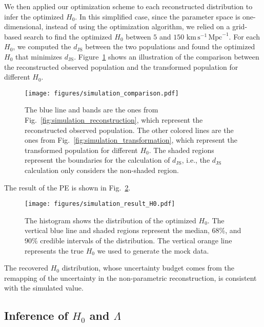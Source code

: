 \documentclass[sn-aps, pdflatex]{sn-jnl}
\begin{document}
We then applied our optimization scheme to each reconstructed distribution to infer the optimized $H_0$.
In this simplified case, since the parameter space is one-dimensional, instead of using the optimization algorithm, we relied on a grid-based search to find the optimized $H_0$ between $5$ and $150$ $\mathrm{km}\,\mathrm{s}^{-1}\,\mathrm{Mpc}^{-1}$.
For each $H_0$, we computed the $d_\mathrm{JS}$ between the two populations and found the optimized $H_0$ that minimizes $d_\mathrm{JS}$.
Figure~\ref{fig:simulation_comparison} shows an illustration of the comparison between the reconstructed observed population and the transformed population for different $H_0$.
\begin{figure}[htbp]
    \texttt{[image: figures/simulation\_comparison.pdf]}
    \caption{
        The blue line and bands are the ones from Fig.~\ref{fig:simulation_reconstruction}, which represent the reconstructed observed population.
        The other colored lines are the ones from Fig.~\ref{fig:simulation_transformation}, which represent the transformed population for different $H_0$.
        The shaded regions represent the boundaries for the calculation of $d_\mathrm{JS}$, i.e., the $d_\mathrm{JS}$ calculation only considers the non-shaded region.
    }
    \label{fig:simulation_comparison}
\end{figure}

The result of the \ac{PE} is shown in Fig.~\ref{fig:simulation_result_H0}.
\begin{figure}[htbp]
    \texttt{[image: figures/simulation\_result\_H0.pdf]}
    \caption{
        The histogram shows the distribution of the optimized $H_0$.
        The vertical blue line and shaded regions represent the median, 68\%, and 90\% credible intervals of the distribution.
        The vertical orange line represents the true $H_0$ we used to generate the mock data.
    }
    \label{fig:simulation_result_H0}
\end{figure}
The recovered $H_0$ distribution, whose uncertainty budget comes from the remapping of the uncertainty in the non-parametric reconstruction, is consistent with the simulated value.

\subsection{Inference of $H_0$ and $\Lambda$}
\label{sec:inference_multi}
\end{document}
